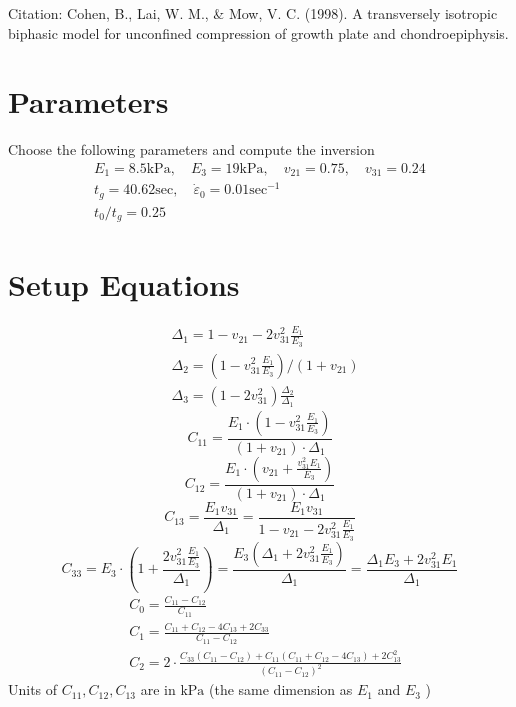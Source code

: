 \documentclass[10pt]{article}
\begin{document}
Citation: Cohen, B., Lai, W. M., \& Mow, V. C. (1998). A transversely isotropic biphasic model for unconfined compression of growth plate and chondroepiphysis.

\section{Parameters}
Choose the following parameters and compute the inversion
$$
\begin{gathered}
E_{1}=8.5 \mathrm{kPa}, \quad E_{3}=19 \mathrm{kPa}, \quad v_{21}=0.75, \quad v_{31}=0.24 \\
t_{g}=40.62 \mathrm{sec}, \quad \dot{\varepsilon}_{0}=0.01 \mathrm{sec}^{-1} \\
t_{0} / t_{g}=0.25
\end{gathered}
$$

\section{Setup Equations}
$$
\begin{aligned}
&\Delta_{1}=1-v_{21}-2 v_{31}^{2} \frac{E_{1}}{E_{3}} \\
&\Delta_{2}=\left(1-v_{31}^{2} \frac{E_{1}}{E_{3}}\right) /\left(1+v_{21}\right) \\
&\Delta_{3}=\left(1-2 v_{31}^{2}\right) \frac{\Delta_{2}}{\Delta_{1}}
\end{aligned}
$$
$$
C_{11}=\frac{E_{1} \cdot\left(1-v_{31}^{2} \frac{E_{1}}{E_{3}}\right)}{\left(1+v_{21}\right) \cdot \Delta_{1}}
$$
$$
C_{12}=\frac{E_{1} \cdot\left(v_{21}+\frac{v_{31}^{2} E_{1}}{E_{3}}\right)}{\left(1+v_{21}\right) \cdot \Delta_{1}}
$$
$$
C_{13}=\frac{E_{1} v_{31}}{\Delta_{1}}=\frac{E_{1} v_{31}}{1-v_{21}-2 v_{31}^{2} \frac{E_{1}}{E_{3}}}
$$
$$
C_{33}=E_{3} \cdot\left(1+\frac{2 v_{31}^{2} \frac{E_{1}}{E_{3}}}{\Delta_{1}}\right)=\frac{E_{3}\left(\Delta_{1}+2 v_{31}^{2} \frac{E_{1}}{E_{3}}\right)}{\Delta_{1}}=\frac{\Delta_{1} E_{3}+2 v_{31}^{2} E_{1}}{\Delta_{1}}
$$
$$
\begin{aligned}
&C_{0}=\frac{C_{11}-C_{12}}{C_{11}} \\
&C_{1}=\frac{C_{11}+C_{12}-4 C_{13}+2 C_{33}}{C_{11}-C_{12}} \\
&C_{2}=2 \cdot \frac{C_{33}\left(C_{11}-C_{12}\right)+C_{11}\left(C_{11}+C_{12}-4 C_{13}\right)+2 C_{13}^{2}}{\left(C_{11}-C_{12}\right)^{2}}
\end{aligned}
$$
Units of $C_{11}, C_{12}, C_{13}$ are in $\mathrm{kPa}$ (the same dimension as $E_{1}$ and $E_{3}$ )
\end{document}
